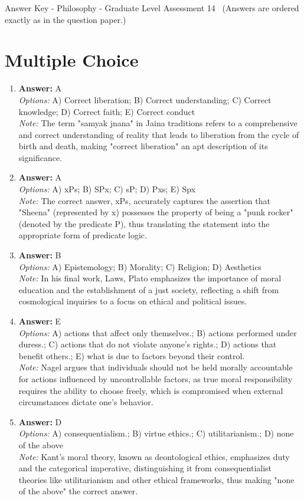 \documentclass[12pt]{article}
\begin{document}
\begin{center}
Answer Key - Philosophy - Graduate Level Assessment 14 \
\small (Answers are ordered exactly as in the question paper.)
\end{center}

\section*{Multiple Choice}
\begin{enumerate}[label=\arabic*.]
\item \textbf{Answer:} A
\\ \textit{Options:} A) Correct liberation; B) Correct understanding; C) Correct knowledge; D) Correct faith; E) Correct conduct
\\ \textit{Note:} The term "samyak jnana" in Jaina traditions refers to a comprehensive and correct understanding of reality that leads to liberation from the cycle of birth and death, making "correct liberation" an apt description of its significance.
\item \textbf{Answer:} A
\\ \textit{Options:} A) xPs; B) SPx; C) sP; D) Pxs; E) Spx
\\ \textit{Note:} The correct answer, xPs, accurately captures the assertion that "Sheena" (represented by x) possesses the property of being a "punk rocker" (denoted by the predicate P), thus translating the statement into the appropriate form of predicate logic.
\item \textbf{Answer:} B
\\ \textit{Options:} A) Epistemology; B) Morality; C) Religion; D) Aesthetics
\\ \textit{Note:} In his final work, Laws, Plato emphasizes the importance of moral education and the establishment of a just society, reflecting a shift from cosmological inquiries to a focus on ethical and political issues.
\item \textbf{Answer:} E
\\ \textit{Options:} A) actions that affect only themselves.; B) actions performed under duress.; C) actions that do not violate anyone's rights.; D) actions that benefit others.; E) what is due to factors beyond their control.
\\ \textit{Note:} Nagel argues that individuals should not be held morally accountable for actions influenced by uncontrollable factors, as true moral responsibility requires the ability to choose freely, which is compromised when external circumstances dictate one's behavior.
\item \textbf{Answer:} D
\\ \textit{Options:} A) consequentialism.; B) virtue ethics.; C) utilitarianism.; D) none of the above
\\ \textit{Note:} Kant's moral theory, known as deontological ethics, emphasizes duty and the categorical imperative, distinguishing it from consequentialist theories like utilitarianism and other ethical frameworks, thus making "none of the above" the correct answer.
\end{enumerate}
\end{document}
